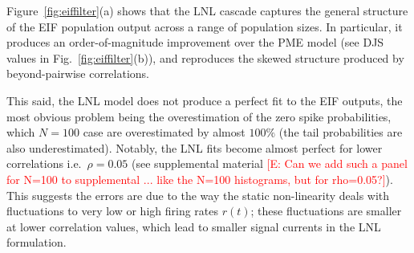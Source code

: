 \documentclass[%
 reprint,
 twocolumn,
 amsmath,amssymb,
 aps,
floatfix,
]{revtex4}
\newcommand{\dd}{\mathrm{d}}
\newcommand{\Ecomment}[1]{\textcolor{red}{[E: #1]}}
\begin{document}




Figure~\ref{fig:eiffilter}(a) shows that the LNL cascade captures the general structure of the EIF population output across a range of population sizes.  In particular, it produces an order-of-magnitude improvement over the PME model (see DJS values in Fig.~\ref{fig:eiffilter}(b)), and reproduces the skewed structure produced by beyond-pairwise correlations.  

This said, the LNL model does not produce a perfect fit to the EIF outputs, the most obvious problem being the overestimation of the zero spike probabilities, which $N=100$ case are overestimated by almost $100\%$ (the tail probabilities are also underestimated).
Notably, the LNL fits become almost perfect for lower correlations i.e.~$\rho = 0.05$ (see supplemental material \Ecomment{Can we add such a panel for N=100 to supplemental ... like the N=100 histograms, but for rho=0.05?}). This suggests the errors are due to the way the static non-linearity deals with fluctuations to very low or high firing rates $r(t)$; these fluctuations are smaller at lower correlation values, which lead to smaller signal currents in the LNL formulation.  
\end{document}

